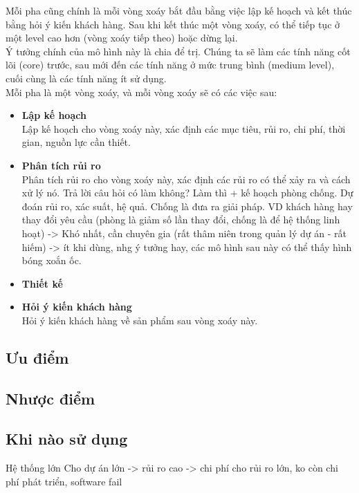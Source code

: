\documentclass[14pt]{extarticle}
\begin{document}
Mỗi pha cũng chính là mỗi vòng xoáy bắt đầu bằng việc lập kế hoạch
và kết thúc bằng hỏi ý kiến khách hàng. Sau khi kết thúc một vòng xoáy,
có thể tiếp tục ở một level cao hơn (vòng xoáy tiếp theo) hoặc dừng lại.\\
Ý tưởng chính của mô hình này là chia để trị. Chúng ta sẽ làm các tính
năng cốt lõi (core) trước, sau mới đến các tính năng ở mức trung bình
(medium level), cuối cùng là các tính năng ít sử dụng.\\

Mỗi pha là một vòng xoáy, và mỗi vòng xoáy sẽ có các việc sau:
\begin{itemize}
  \item \textbf{Lập kế hoạch}\\
        Lập kế hoạch cho vòng xoáy này, xác định các mục tiêu, rủi ro,
        chi phí, thời gian, nguồn lực cần thiết.
  \item \textbf{Phân tích rủi ro}\\
        Phân tích rủi ro cho vòng xoáy này, xác định các rủi ro có thể
        xảy ra và cách xử lý nó.
        Trả lời câu hỏi có làm không? Làm thì + kế hoạch phòng chống. Dự đoán rủi ro, xác suất, hệ quả.
        Chống là đưa ra giải pháp. VD khách hàng hay thay đổi yêu cầu (phòng là giảm số lần thay đổi, chống là để hệ thống linh hoạt) -> Khó nhất, cần chuyên gia (rất thâm niên trong quản lý dự án - rất hiếm) -> ít khi dùng, nhg ý tưởng hay, các mô hình sau này có thể thấy hình bóng xoắn ốc.

  \item \textbf{Thiết kế}\\

  \item \textbf{Hỏi ý kiến khách hàng}\\
        Hỏi ý kiến khách hàng về sản phẩm sau vòng xoáy này.
\end{itemize}

\subsection{Ưu điểm}
\subsection{Nhược điểm}
\subsection{Khi nào sử dụng}
Hệ thống lớn
Cho dự án lớn -> rủi ro cao -> chi phí cho rủi ro lớn, ko còn chi phí phát triển, software fail
\end{document}
